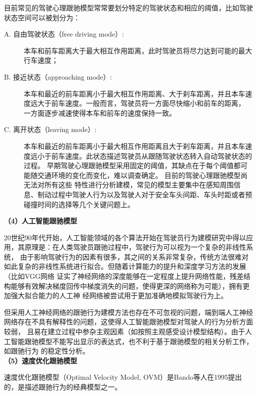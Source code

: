 目前常见的驾驶心理跟驰模型常常要划分特定的驾驶状态和相应的阈值，比如驾驶状态空间可以被划分为：\\

\begin{description}
\item [A. 自由驾驶状态（free driving mode）:]
  本车和前车距离大于最大相互作用距离，此时驾驶员将尽力达到可能的最大行车速度； \\
\item [B. 接近状态（approaching mode）:]
  本车和最近的前车距离小于最大相互作用距离、大于刹车距离，并且本车速度远大于前车速度。一般而言，驾驶员将一方面尽快缩小和前车的距离，
  一方面逐步减速使得本车和前车的速度保持一致。 \\
\item [C. 离开状态（leaving mode）:]
  本车和最近的前车距离小于最大相互作用距离且大于刹车距离，并且本车速度远小于前车速度。此状态描述驾驶员从跟随驾驶状态转入自动驾驶状态的过程。
  早期驾驶心理跟驰模型采用固定的阈值，其缺点在于每个阈值都可能随交通环境的变化而变化，难以调查确定。 目前的驾驶心理跟驰模型尚无法对所有这些
  特性进行分析建模，常见的模型主要集中在感知周围信息、制动过程中驾驶人行为以及驾驶人对于安全车头间距、车头时距或者预碰撞时间的选择等几个关键问题上。
\end{description}  

\vbox{}

\noindent \textbf{（4）人工智能跟驰模型}

20世纪90年代开始，人工智能领域的各个算法开始在驾驶员行为建模研究中得以应用，其原理是：在人类驾驶员跟驰过程中，驾驶行为可以视为一个复杂的非线性系统，
由于影响驾驶行为的因素有很多，其之间的关系非常复杂，传统方法很难对如此复杂的非线性系统进行拟合。但随着计算能力的提升和深度学习方法的发展（比如VGG网络
证实了神经网络的深度能够在一定程度上提升网络性能，残差结构能够有效解决梯度回传中梯度消失的问题，使得更深的网络称为可能），拥有更加强大拟合能力的人工神
经网络被尝试用于更加准确地模拟驾驶行为上。\cite{Kikuchi1992fuzzy}

但采用人工神经网络的跟驰行为建模方法也存在不可忽视的问题，端到端人工神经网络存在不具有解释性的问题，这使得人工智能跟驰模型对驾驶人的行为分析方面较弱，
且易在建立过程中参杂主观因素（如按照主观感受设计模型结构）。由于人工智能跟驰模型不能写出显示的表达式，也不利于基于跟驰模型的相关分析工作，如跟驰行为
的稳定性分析。 \\ 

\noindent \textbf{（5）速度优化跟驰模型}

速度优化跟驰模型（Optimal Velocity Model, OVM）是Bando等人在1995提出的，是描述跟驰行为的经典模型之一。\cite{PhysRevE.51.1035}

